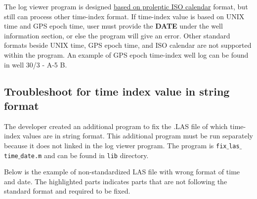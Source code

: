 \documentclass[12pt,a4paper,oneside]{report}
\begin{document}
\begin{appendices}
The log viewer program is designed \ul{based on proleptic ISO calendar} format, but still can process other time-index format. If time-index value is based on UNIX time and GPS epoch time, user must provide the \textbf{DATE} under the well information section, or else the program will give an error. Other standard formats beside UNIX time, GPS epoch time, and ISO calendar are not supported within the program. An example of GPS epoch time-index well log can be found in well 30/3 - A-5 B.


\subsection{Troubleshoot for time index value in string format}
The developer created an additional program to fix the .LAS file of which time-index values are in string format. This additional program must be run separately because it does not linked in the log viewer program. The program is \texttt{fix$\_$las$\_$time$\_$date.m} and can be found in \texttt{lib} directory.

\pagebreak
Below is the example of non-standardized LAS file with wrong format of time and date. The highlighted parts indicates parts that are not following the standard format and required to be fixed.


\end{appendices}
\end{document}
